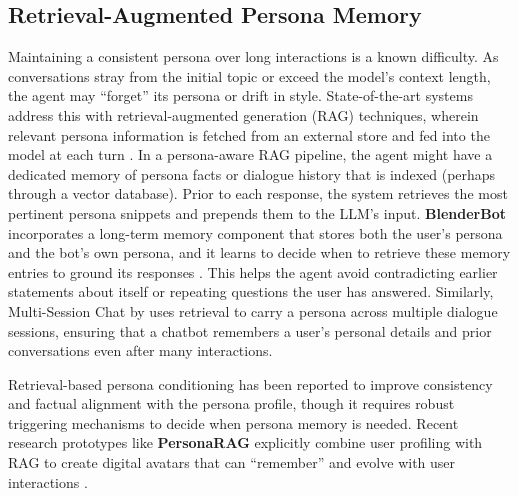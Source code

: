 \subsection{Retrieval-Augmented Persona Memory}
Maintaining a consistent persona over long interactions is a known difficulty. As conversations stray from the initial topic or exceed the model's context length, the agent may ``forget'' its persona or drift in style. State-of-the-art systems address this with retrieval-augmented generation (RAG) techniques, wherein relevant persona information is fetched from an external store and fed into the model at each turn \cite{shuster2022blenderbot3deployedconversational,xu-etal-2022-beyond}. In a persona-aware RAG pipeline, the agent might have a dedicated memory of persona facts or dialogue history that is indexed (perhaps through a vector database).  Prior to each response, the system retrieves the most pertinent persona snippets and prepends them to the LLM's input. \textbf{BlenderBot} \cite{shuster2022blenderbot3deployedconversational} incorporates a long-term memory component that stores both the user's persona and the bot's own persona, and it learns to decide when to retrieve these memory entries to ground its responses \cite{shuster2022blenderbot3deployedconversational}. This helps the agent avoid contradicting earlier statements about itself or repeating questions the user has answered. Similarly, Multi-Session Chat by \cite{xu-etal-2022-beyond} uses retrieval to carry a persona across multiple dialogue sessions, ensuring that a chatbot remembers a user's personal details and prior conversations even after many interactions.

Retrieval-based persona conditioning has been reported to improve consistency and factual alignment with the persona profile, though it requires robust triggering mechanisms to decide when persona memory is needed. Recent research prototypes like \textbf{PersonaRAG} explicitly combine user profiling with RAG to create digital avatars that can ``remember'' and evolve with user interactions \cite{kimara-etal-2025-personaAI}. 

